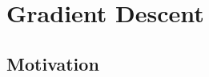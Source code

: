 \documentclass[10pt,compress]{beamer} %
\begin{document}




\section{Gradient Descent}
\subsection{Motivation}
\end{document}
